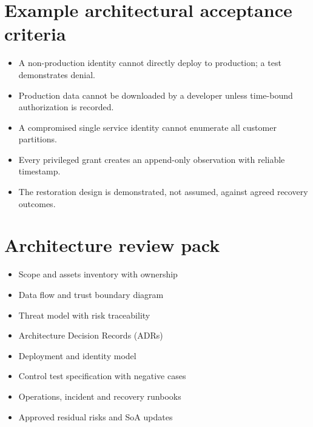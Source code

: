\documentclass[11pt,letterpaper]{article}
\begin{document}
\section{Example architectural acceptance criteria}
\begin{itemize}
\item A non-production identity cannot directly deploy to production; a test demonstrates denial.
\item Production data cannot be downloaded by a developer unless time-bound authorization is recorded.
\item A compromised single service identity cannot enumerate all customer partitions.
\item Every privileged grant creates an append-only observation with reliable timestamp.
\item The restoration design is demonstrated, not assumed, against agreed recovery outcomes.
\end{itemize}

\section{Architecture review pack}
\begin{itemize}
\item Scope and assets inventory with ownership
\item Data flow and trust boundary diagram
\item Threat model with risk traceability
\item Architecture Decision Records (ADRs)
\item Deployment and identity model
\item Control test specification with negative cases
\item Operations, incident and recovery runbooks
\item Approved residual risks and SoA updates
\end{itemize}
\end{document}
